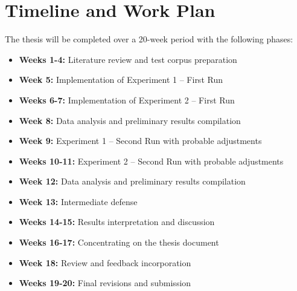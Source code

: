 \documentclass[12pt]{article}
\begin{document}
\section{Timeline and Work Plan}
The thesis will be completed over a 20-week period with the following phases:
\begin{itemize}
    \item \textbf{Weeks 1-4:} Literature review and test corpus preparation
    \item \textbf{Week 5:} Implementation of Experiment 1 -- First Run
    \item \textbf{Weeks 6-7:} Implementation of Experiment 2 -- First Run
    \item \textbf{Week 8:} Data analysis and preliminary results compilation
    \item \textbf{Week 9:} Experiment 1 -- Second Run with probable adjustments
    \item \textbf{Weeks 10-11:} Experiment 2 -- Second Run with probable adjustments
    \item \textbf{Week 12:} Data analysis and preliminary results compilation
    \item \textbf{Week 13:} Intermediate defense
    \item \textbf{Weeks 14-15:} Results interpretation and discussion
    \item \textbf{Weeks 16-17:} Concentrating on the thesis document
    \item \textbf{Week 18:} Review and feedback incorporation
    \item \textbf{Weeks 19-20:} Final revisions and submission
\end{itemize}
\end{document}
